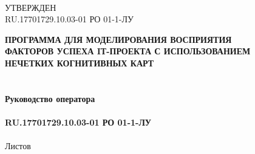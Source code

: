 \documentclass{article}
\begin{document}
    \newpage
    \clearpage
    \begin{textbf}
        \\
        УТВЕРЖДЕН\\
        RU.17701729.10.03-01 РО 01-1-ЛУ\\
    \end{textbf}
    \bigskip
    \begin{center}
        \topskip=0pt
        \vspace*{\fill}
        \textbf{ПРОГРАММА ДЛЯ МОДЕЛИРОВАНИЯ ВОСПРИЯТИЯ\\
        ФАКТОРОВ УСПЕХА IТ-ПРОЕКТА С ИСПОЛЬЗОВАНИЕМ\\
        НЕЧЕТКИХ КОГНИТИВНЫХ КАРТ\\
        ~\\
        ~\\
        Руководство оператора\\
        ~\\
        RU.17701729.10.03-01 РО 01-1-ЛУ}\\
        ~\\
        Листов \ztotpages\\
        \vspace*{\fill}
    \end{center}
    \begin{center}
    \end{center}
    \newpage
    \tableofcontents
    \newpage
\end{document}
